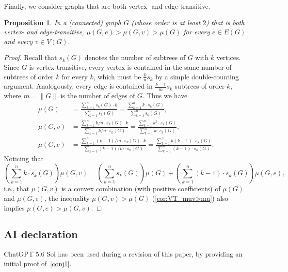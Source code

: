 \documentclass[11pt]{article}
\newtheorem{prop}[thr]{Proposition}
\theoremstyle{definition}
\begin{document}
Finally, we consider graphs that are both vertex- and edge-transitive.

\begin{prop}\label{prop:VET_mue>muv>mu}
    In a (connected) graph $G$ (whose order is at least $2$) that is both vertex- and  edge-transitive, $\mu(G,e)> \mu(G,v)>\mu(G)$ for every $e \in E(G)$ and every $v\in V(G)$.
\end{prop}

\begin{proof}
    Recall that $s_k(G)$ denotes the number of subtrees of $G$ with $k$ vertices. 
    Since $G$ is vertex-transitive, every vertex is contained in the same number of subtrees of order $k$ for every $k$, which must be $\frac{k}{n} s_k$ by a simple double-counting argument. Analogously, every edge is contained in $\frac{k-1}{m} s_k$ subtrees of order $k$, where $m=\| G \|$ is the number of edges of $G$. Thus we have
    \begin{align*}
        \mu(G) &= \frac{ \sum_{k=1}^n s_k(G)\cdot k}{ \sum_{k=1}^n s_k(G)} = \frac{ \sum_{k=1}^n k\cdot s_k(G)}{ \sum_{k=1}^n s_k(G)},\\
        \mu(G,v)  &= \frac{ \sum_{k=1}^n k/n\cdot s_k(G)\cdot k}{ \sum_{k=1}^n k/n\cdot s_k(G)} = \frac{ \sum_{k=1}^n k^2\cdot s_k(G)}{ \sum_{k=1}^n k\cdot s_k(G)},\\
        \mu(G,e)&= \frac{ \sum_{k=1}^n (k-1)/m \cdot s_k(G) \cdot k}{ \sum_{k=1}^n (k-1)/m \cdot s_k(G)} = \frac{ \sum_{k=1}^n k(k-1)\cdot s_k(G)}{ \sum_{k=1}^n (k-1) \cdot s_k(G)}.
    \end{align*}
    Noticing that $$\left( \sum_{k=1}^n k\cdot s_k(G) \right)  \mu(G,v) =\left(\sum_{k=1}^n s_k(G) \right) \mu(G) + \left( \sum_{k=1}^n (k-1) \cdot s_k(G) \right)\mu(G,e),$$
    i.e., that $\mu(G,v)$ is a convex combination (with positive coefficients) of $\mu(G) $ and $\mu(G,e)$, the inequality $\mu(G,v)>\mu(G)$ (\cref{cor:VT_muv>mu}) also implies $\mu(G,e)> \mu(G,v).$
\end{proof}



\subsection*{AI declaration}

ChatGPT 5.6 Sol has been used during a revision of this paper, by providing an initial proof of~\cref{conj1}.
\end{document}
